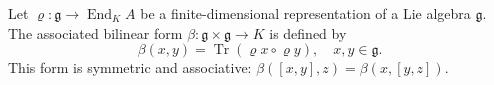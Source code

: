 Let $\varrho : \mathfrak{g} \rightarrow \operatorname{End}_K A$ be a finite-dimensional representation of a Lie algebra $\mathfrak{g}$. The associated bilinear form $\beta : \mathfrak{g} \times \mathfrak{g} \rightarrow K$ is defined by
$$\beta(x, y) = \operatorname{Tr}(\varrho x \circ \varrho y), \quad x, y \in \mathfrak{g}.$$
This form is symmetric and associative: $\beta([x, y], z) = \beta(x, [y, z])$.

